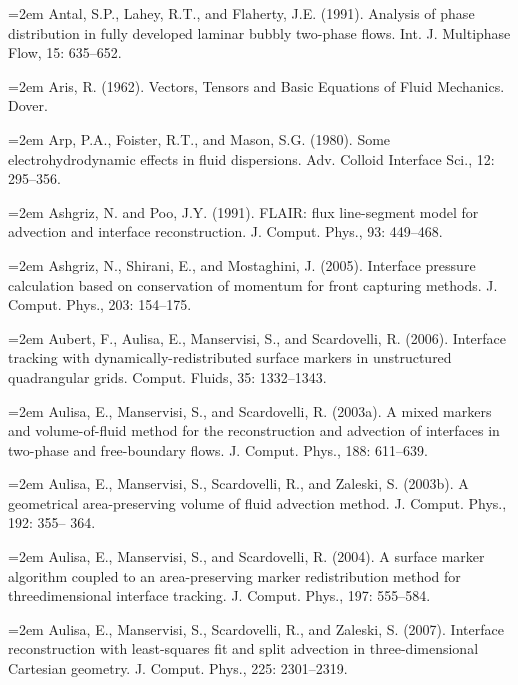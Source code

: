 \documentclass[11pt,a4paper,openany,fontset=none]{ctexbook}
\begin{document}

\par\hangindent=2em Antal, S.P., Lahey, R.T., and Flaherty, J.E. (1991). Analysis of phase distribution in fully developed laminar bubbly two-phase flows. Int. J. Multiphase Flow, 15: 635--652.

\par\hangindent=2em Aris, R. (1962). Vectors, Tensors and Basic Equations of Fluid Mechanics. Dover.

\par\hangindent=2em Arp, P.A., Foister, R.T., and Mason, S.G. (1980). Some electrohydrodynamic effects in fluid dispersions. Adv. Colloid Interface Sci., 12: 295--356.

\par\hangindent=2em Ashgriz, N. and Poo, J.Y. (1991). FLAIR: flux line-segment model for advection and interface reconstruction. J. Comput. Phys., 93: 449--468.

\par\hangindent=2em Ashgriz, N., Shirani, E., and Mostaghini, J. (2005). Interface pressure calculation based on conservation of momentum for front capturing methods. J. Comput. Phys., 203: 154--175.

\par\hangindent=2em Aubert, F., Aulisa, E., Manservisi, S., and Scardovelli, R. (2006). Interface tracking with dynamically-redistributed surface markers in unstructured quadrangular grids. Comput. Fluids, 35: 1332--1343.

\par\hangindent=2em Aulisa, E., Manservisi, S., and Scardovelli, R. (2003a). A mixed markers and volume-of-fluid method for the reconstruction and advection of interfaces in two-phase and free-boundary flows. J. Comput. Phys., 188: 611--639.

\par\hangindent=2em Aulisa, E., Manservisi, S., Scardovelli, R., and Zaleski, S. (2003b). A geometrical area-preserving volume of fluid advection method. J. Comput. Phys., 192: 355-- 364.

\par\hangindent=2em Aulisa, E., Manservisi, S., and Scardovelli, R. (2004). A surface marker algorithm coupled to an area-preserving marker redistribution method for threedimensional interface tracking. J. Comput. Phys., 197: 555--584.

\par\hangindent=2em Aulisa, E., Manservisi, S., Scardovelli, R., and Zaleski, S. (2007). Interface reconstruction with least-squares fit and split advection in three-dimensional Cartesian geometry. J. Comput. Phys., 225: 2301--2319.
\end{document}

